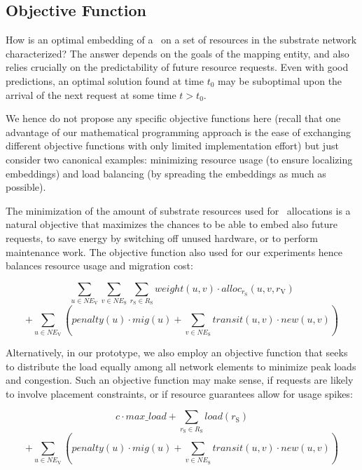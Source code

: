 \documentclass[conference,10pt]{IEEEtran}
\newcommand{\CloudNet}{\text{CloudNet}}
\newcommand{\mrm}{\mathrm}
\begin{document}
\subsection{Objective Function}\label{ssec:mip:prog:objective}

How is an optimal embedding of a \CloudNet\ on a
set of resources in the substrate network characterized?
The answer depends on the goals of the mapping entity, and also
relies crucially on the predictability of future resource requests.
Even with good predictions, an optimal solution found at time $t_0$
may be suboptimal upon the arrival of the next request at some time
$t>t_0$.

We hence do not propose any specific objective functions here (recall that one advantage of our mathematical programming approach is the ease of exchanging different objective functions with only limited implementation effort) but just consider two canonical examples:
minimizing resource usage (to ensure localizing embeddings) and load balancing (by spreading the embeddings as much as possible).


The minimization of the amount of substrate resources used for \CloudNet\ allocations is a natural objective that maximizes the chances to be able to embed also future requests, to save energy by switching off unused hardware, or to perform maintenance work. The objective function also used for our experiments hence balances resource usage and migration cost:

\begin{footnotesize}
$$\sum_{u \in NE_\mrm{V}} \sum_{v \in NE_\mrm{S}} \sum_{r_\mrm{S} \in R_\mrm{S}}
weight(u,v)\cdot alloc_{r_\mrm{S}}(u,v,r_\mrm{V})$$
$$
+ \sum_{u \in NE_\mrm{V}}\left( penalty(u)\cdot mig(u) + \sum_{v \in
NE_\mrm{S}} transit(u,v)\cdot new(u,v) \right)$$
\end{footnotesize}


Alternatively, in our prototype, we also employ an objective function that seeks to
distribute the load equally among all network elements to minimize
peak loads and congestion.
Such an objective function may make sense, if requests are likely to involve placement constraints, or if resource guarantees allow for usage spikes:

\begin{footnotesize}
$$c\cdot max\_load + \sum_{r_\mrm{S} \in R_\mrm{S}} load(r_\mrm{S})$$
$$+
\sum_{u \in NE_\mrm{V}} \left( penalty(u)\cdot mig(u) + \sum_{v \in
NE_\mrm{S}} transit(u,v)\cdot new(u,v) \right)$$
\end{footnotesize}
\end{document}
